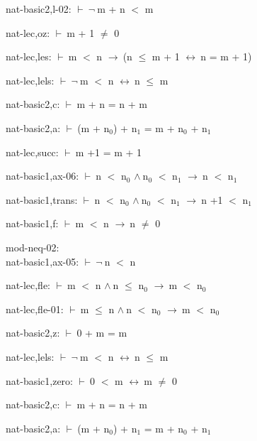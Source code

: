\documentclass[a4paper]{article}
\newcommand{\Fol}{\mbox{$\vdash\ $}}
\newcommand{\Not}{\mbox{$\neg\ $}}
\newcommand{\And}{\mbox{$\wedge\ $}}
\newcommand{\Imp}{\mbox{$\rightarrow\ $}}
\newcommand{\Equiv}{\mbox{$\leftrightarrow\ $}}
\begin{document}
nat-basic2,l-02: 
 \Fol \Not m + n $<$ m



nat-lec,oz: 
 \Fol m + 1 $\neq$ 0



nat-lec,les: 
 \Fol m $<$ n \Imp (n $\le$ m + 1 \Equiv n = m + 1)



nat-lec,lels: 
 \Fol \Not m $<$ n \Equiv n $\le$ m



nat-basic2,c: 
 \Fol m + n = n + m



nat-basic2,a: 
 \Fol (m + $\mbox{n}_{0}$) + $\mbox{n}_{1}$ = m + $\mbox{n}_{0}$ + $\mbox{n}_{1}$



nat-lec,succ: 
 \Fol m +1 = m + 1



nat-basic1,ax-06: 
 \Fol n $<$ $\mbox{n}_{0}$ \And $\mbox{n}_{0}$ $<$ $\mbox{n}_{1}$ \Imp n $<$ $\mbox{n}_{1}$



nat-basic1,trans: 
 \Fol n $<$ $\mbox{n}_{0}$ \And $\mbox{n}_{0}$ $<$ $\mbox{n}_{1}$ \Imp n +1 $<$ $\mbox{n}_{1}$



nat-basic1,f: 
 \Fol m $<$ n \Imp n $\neq$ 0



\bigskip

mod-neq-02:\\ nat-basic1,ax-05: 
 \Fol \Not n $<$ n



nat-lec,fle: 
 \Fol m $<$ n \And n $\le$ $\mbox{n}_{0}$ \Imp m $<$ $\mbox{n}_{0}$



nat-lec,fle-01: 
 \Fol m $\le$ n \And n $<$ $\mbox{n}_{0}$ \Imp m $<$ $\mbox{n}_{0}$



nat-basic2,z: 
 \Fol 0 + m = m



nat-lec,lels: 
 \Fol \Not m $<$ n \Equiv n $\le$ m



nat-basic1,zero: 
 \Fol 0 $<$ m \Equiv m $\neq$ 0



nat-basic2,c: 
 \Fol m + n = n + m



nat-basic2,a: 
 \Fol (m + $\mbox{n}_{0}$) + $\mbox{n}_{1}$ = m + $\mbox{n}_{0}$ + $\mbox{n}_{1}$
\end{document}
